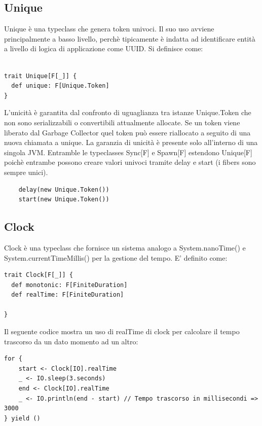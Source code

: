 \subsection{Unique}
Unique è una typeclass che genera token univoci. Il suo uso avviene principalmente a basso livello, perchè tipicamente è indatta ad identificare entità a livello di logica di applicazione come UUID. Si definisce come: 
\begin{verbatim}

trait Unique[F[_]] {
  def unique: F[Unique.Token]
}
\end{verbatim}

L'unicità è garantita dal confronto di uguaglianza tra istanze Unique.Token che non sono serializzabili o convertibili attualmente allocate. Se un token viene liberato dal Garbage Collector quel token può essere riallocato a seguito di una nuova chiamata a unique. La garanzia di unicità è presente solo all’interno di una singola JVM. Entramble le typeclasses Sync[F] e Spawn[F] estendono Unique[F] poichè entrambe possono creare valori univoci tramite delay e start (i fibers sono sempre unici). 
\begin{verbatim}
    delay(new Unique.Token())
    start(new Unique.Token())
\end{verbatim}

\subsection{Clock}
Clock è una typeclass che fornisce un sistema analogo a System.nanoTime() e System.currentTimeMillis() per la gestione del tempo. E' definito come:
\begin{verbatim}
trait Clock[F[_]] {
  def monotonic: F[FiniteDuration]
  def realTime: F[FiniteDuration]

}
\end{verbatim}

Il seguente codice mostra un uso di realTime di clock per calcolare il tempo trascorso da un dato momento ad un altro:

\begin{verbatim}
for {
    start <- Clock[IO].realTime
    _ <- IO.sleep(3.seconds)
    end <- Clock[IO].realTime
    _ <- IO.println(end - start) // Tempo trascorso in millisecondi => 3000
} yield ()
    
\end{verbatim}

